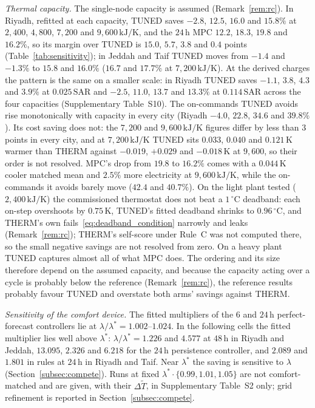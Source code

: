 \documentclass[pdflatex,sn-mathphys-num,iicol]{sn-jnl}
\theoremstyle{thmstyleone}\newtheorem{proposition}{Proposition}\newtheorem{corollary}{Corollary}
\theoremstyle{thmstyletwo}\newtheorem{remark}{Remark}\newtheorem{observation}{Observation}
\theoremstyle{thmstylethree}\newtheorem{definition}{Definition}
\newcommand{\SAR}{\text{SAR}}
\begin{document}
\emph{Thermal capacity.} The single-node capacity is assumed (Remark~\ref{rem:rc}). In Riyadh, refitted at each capacity, TUNED saves $-2.8$, $12.5$, $16.0$ and $15.8\%$ at $2{,}400$, $4{,}800$, $7{,}200$ and $9{,}600\,\text{kJ/K}$, and the $24\,$h MPC $12.2$, $18.3$, $19.8$ and $16.2\%$, so its margin over TUNED is $15.0$, $5.7$, $3.8$ and $0.4$ points (Table~\ref{tab:sensitivity}); in Jeddah and Taif TUNED moves from $-1.4$ and $-1.3\%$ to $15.8$ and $16.0\%$ ($16.7$ and $17.7\%$ at $7{,}200\,\text{kJ/K}$). At the derived charges the pattern is the same on a smaller scale: in Riyadh TUNED saves $-1.1$, $3.8$, $4.3$ and $3.9\%$ at $0.025\,\SAR$ and $-2.5$, $11.0$, $13.7$ and $13.3\%$ at $0.114\,\SAR$ across the four capacities (Supplementary Table~S10). The on-commands TUNED avoids rise monotonically with capacity in every city (Riyadh $-4.0$, $22.8$, $34.6$ and $39.8\%$). Its cost saving does not: the $7{,}200$ and $9{,}600\,\text{kJ/K}$ figures differ by less than $3$ points in every city, and at $7{,}200\,\text{kJ/K}$ TUNED sits $0.033$, $0.040$ and $0.121\,$K warmer than THERM against $-0.019$, $+0.029$ and $-0.018\,$K at $9{,}600$, so their order is not resolved. MPC's drop from $19.8$ to $16.2\%$ comes with a $0.044\,$K cooler matched mean and $2.5\%$ more electricity at $9{,}600\,\text{kJ/K}$, while the on-commands it avoids barely move ($42.4$ and $40.7\%$). On the light plant tested ($2{,}400\,\text{kJ/K}$) the commissioned thermostat does not beat a $1\,^\circ$C deadband: each on-step overshoots by $0.75\,$K, TUNED's fitted deadband shrinks to $0.96\,^\circ$C, and THERM's own fails~\eqref{eq:deadband_condition} narrowly and leaks (Remark~\ref{rem:rc}); THERM's self-score under Rule~C was not computed there, so the small negative savings are not resolved from zero. On a heavy plant TUNED captures almost all of what MPC does. The ordering and its size therefore depend on the assumed capacity, and because the capacity acting over a cycle is probably below the reference (Remark~\ref{rem:rc}), the reference results probably favour TUNED and overstate both arms' savings against THERM.

\emph{Sensitivity of the comfort device.} The fitted multipliers of the $6$ and $24\,$h perfect-forecast controllers lie at $\lambda/\lambda^\ast=1.002$--$1.024$. In the following cells the fitted multiplier lies well above $\lambda^\ast$: $\lambda/\lambda^\ast=1.226$ and $4.577$ at $48\,$h in Riyadh and Jeddah, $13.095$, $2.326$ and $6.218$ for the $24\,$h persistence controller, and $2.089$ and $1.801$ in rules at $24\,$h in Riyadh and Taif. Near $\lambda^\ast$ the saving is sensitive to $\lambda$ (Section~\ref{subsec:compete}). Runs at fixed $\lambda^\ast\cdot\{0.99,1.01,1.05\}$ are not comfort-matched and are given, with their $\Delta\tilde T$, in Supplementary Table~S2 only; grid refinement is reported in Section~\ref{subsec:compete}.
\end{document}
